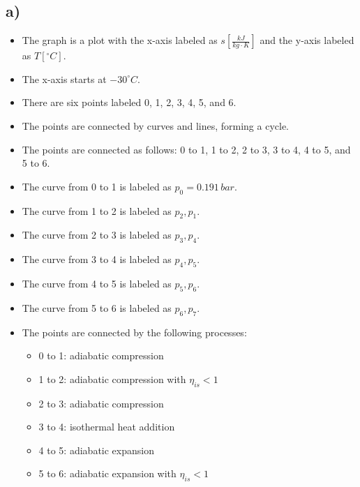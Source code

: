 

\subsection*{a)}

\begin{itemize}
    \item The graph is a plot with the x-axis labeled as $s \left[ \frac{kJ}{kg \cdot K} \right]$ and the y-axis labeled as $T \left[ ^\circ C \right]$.
    \item The x-axis starts at $-30^\circ C$.
    \item There are six points labeled 0, 1, 2, 3, 4, 5, and 6.
    \item The points are connected by curves and lines, forming a cycle.
    \item The points are connected as follows: 0 to 1, 1 to 2, 2 to 3, 3 to 4, 4 to 5, and 5 to 6.
    \item The curve from 0 to 1 is labeled as $p_0 = 0.191 \, bar$.
    \item The curve from 1 to 2 is labeled as $p_2, p_1$.
    \item The curve from 2 to 3 is labeled as $p_3, p_4$.
    \item The curve from 3 to 4 is labeled as $p_4, p_5$.
    \item The curve from 4 to 5 is labeled as $p_5, p_6$.
    \item The curve from 5 to 6 is labeled as $p_6, p_7$.
    \item The points are connected by the following processes:
        \begin{itemize}
            \item 0 to 1: adiabatic compression
            \item 1 to 2: adiabatic compression with $\eta_{is} < 1$
            \item 2 to 3: adiabatic compression
            \item 3 to 4: isothermal heat addition
            \item 4 to 5: adiabatic expansion
            \item 5 to 6: adiabatic expansion with $\eta_{is} < 1$
        \end{itemize}
\end{itemize}